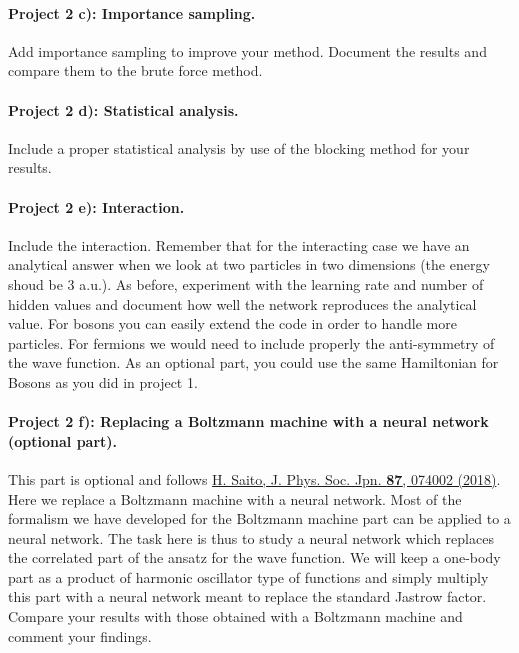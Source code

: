 \documentclass[%
oneside,                 %
final,                   %
10pt]{article}
\begin{document}
\paragraph{Project 2 c): Importance sampling.}
Add importance sampling to improve your method. Document the results and compare them to the brute force method.

\paragraph{Project 2 d): Statistical analysis.}
Include a proper statistical analysis by use of the blocking method for your results.

\paragraph{Project 2 e): Interaction.}
Include the interaction. Remember that for the interacting case we
have an analytical answer when we look at two particles in two
dimensions (the energy shoud be 3 a.u.). 
As before, experiment with the learning rate and
number of hidden values and document how well the network reproduces
the analytical value.
For bosons you can easily extend the code in order to handle more particles. For fermions we would need to include properly the anti-symmetry of the wave function. As an optional part, you could use the same Hamiltonian for Bosons as you did in project 1.

\paragraph{Project 2 f): Replacing a Boltzmann machine with a neural network (optional part).}
This part is optional and follows \href{{https://journals.jps.jp/doi/10.7566/JPSJ.87.074002}}{H. Saito, J. Phys. Soc. Jpn. \textbf{87}, 074002 (2018)}. Here we replace a Boltzmann machine with a neural network. Most of the formalism we have developed for the Boltzmann machine part can be applied to a neural network. The task here is thus to study a neural network which replaces the correlated part of the ansatz for the wave function. We will keep a one-body part as a product of harmonic oscillator type of functions and simply multiply this part with a neural network  meant to replace the standard Jastrow factor. Compare your results with those obtained with a Boltzmann machine and comment your findings.
\end{document}
